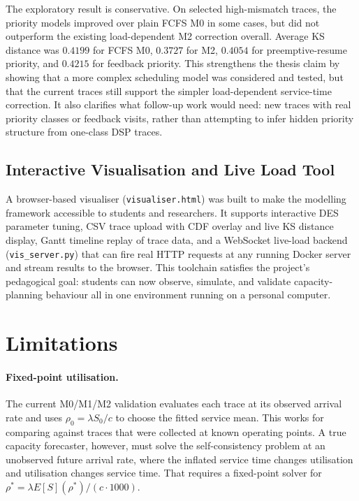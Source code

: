 The exploratory result is conservative. On selected high-mismatch traces, the priority models improved over plain FCFS M0 in some cases, but did not outperform the existing load-dependent M2 correction overall. Average KS distance was $0.4199$ for FCFS M0, $0.3727$ for M2, $0.4054$ for preemptive-resume priority, and $0.4215$ for feedback priority. This strengthens the thesis claim by showing that a more complex scheduling model was considered and tested, but that the current traces still support the simpler load-dependent service-time correction. It also clarifies what follow-up work would need: new traces with real priority classes or feedback visits, rather than attempting to infer hidden priority structure from one-class DSP traces.

\subsection{Interactive Visualisation and Live Load Tool}

A browser-based visualiser (\texttt{visualiser.html}) was built to make the modelling framework accessible to students and researchers. It supports interactive DES parameter tuning, CSV trace upload with CDF overlay and live KS distance display, Gantt timeline replay of trace data, and a WebSocket live-load backend (\texttt{vis\_server.py}) that can fire real HTTP requests at any running Docker server and stream results to the browser. This toolchain satisfies the project's pedagogical goal: students can now observe, simulate, and validate capacity-planning behaviour all in one environment running on a personal computer.

\section{Limitations}

\paragraph{Fixed-point utilisation.}
The current M0/M1/M2 validation evaluates each trace at its observed arrival rate and uses $\rho_0=\lambda S_0/c$ to choose the fitted service mean. This works for comparing against traces that were collected at known operating points. A true capacity forecaster, however, must solve the self-consistency problem at an unobserved future arrival rate, where the inflated service time changes utilisation and utilisation changes service time. That requires a fixed-point solver for $\rho^* = \lambda E[S](\rho^*)/(c \cdot 1000)$.

